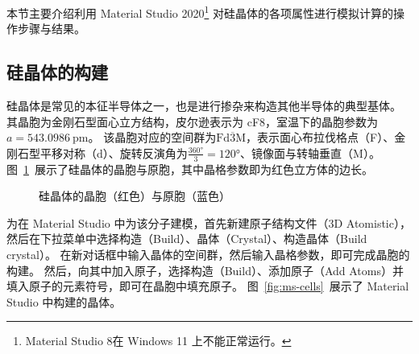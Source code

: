 
本节主要介绍利用 Material Studio 2020\footnote{Material Studio 8在 Windows 11 上不能正常运行。} 对硅晶体的各项属性进行模拟计算的操作步骤与结果。

\subsection{硅晶体的构建}

硅晶体是常见的本征半导体之一，也是进行掺杂来构造其他半导体的典型基体。
其晶胞为金刚石型面心立方结构，皮尔逊表示为 cF8，室温下的晶胞参数为$a = \qty{543.0986}{\pico\metre}$。
该晶胞对应的空间群为$\mathrm{Fd\overline{3}M}$，表示面心布拉伐格点（F）、金刚石型平移对称（d）、旋转反演角为$\frac{\ang{360}}{3}=\ang{120}$、镜像面与转轴垂直（M）。
图~\ref{fig:silicon-cell}~展示了硅晶体的晶胞与原胞，其中晶格参数即为红色立方体的边长。

\begin{figure}[ht!]
    \centering
    \begin{asy}
        
    \end{asy}
    \caption{硅晶体的晶胞（红色）与原胞（蓝色）}\label{fig:silicon-cell}
\end{figure}

为在 Material Studio 中为该分子建模，首先新建原子结构文件（3D Atomistic），然后在下拉菜单中选择构造（Build）、晶体（Crystal）、构造晶体（Build crystal）。
在新对话框中输入晶体的空间群，然后输入晶格参数，即可完成晶胞的构建。
然后，向其中加入原子，选择构造（Build）、添加原子（Add Atoms）并填入原子的元素符号，即可在晶胞中填充原子。
图~\ref{fig:ms-cells}~展示了 Material Studio 中构建的晶体。

